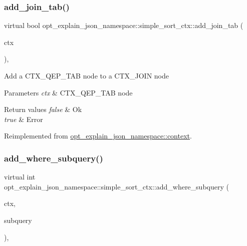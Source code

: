 \subsubsection{\texorpdfstring{add\+\_\+join\+\_\+tab()}{add\_join\_tab()}}
{\footnotesize\ttfamily virtual bool opt\+\_\+explain\+\_\+json\+\_\+namespace\+::simple\+\_\+sort\+\_\+ctx\+::add\+\_\+join\+\_\+tab (\begin{DoxyParamCaption}\item[{\mbox{\hyperlink{classopt__explain__json__namespace_1_1joinable__ctx}{joinable\+\_\+ctx}} $\ast$}]{ctx }\end{DoxyParamCaption})\hspace{0.3cm}{\ttfamily [inline]}, {\ttfamily [virtual]}}

Add a C\+T\+X\+\_\+\+Q\+E\+P\+\_\+\+T\+AB node to a C\+T\+X\+\_\+\+J\+O\+IN node


\begin{DoxyParams}{Parameters}
{\em ctx} & C\+T\+X\+\_\+\+Q\+E\+P\+\_\+\+T\+AB node\\
\hline
\end{DoxyParams}

\begin{DoxyRetVals}{Return values}
{\em false} & Ok \\
\hline
{\em true} & Error \\
\hline
\end{DoxyRetVals}


Reimplemented from \mbox{\hyperlink{classopt__explain__json__namespace_1_1context_a3f7a03f0bf2a519a19b84cb5a99ee304}{opt\+\_\+explain\+\_\+json\+\_\+namespace\+::context}}.

\mbox{\label{classopt__explain__json__namespace_1_1simple__sort__ctx_a334cf6e47221f587df9e1012819cf19d}} 
\subsubsection{\texorpdfstring{add\+\_\+where\+\_\+subquery()}{add\_where\_subquery()}}
{\footnotesize\ttfamily virtual int opt\+\_\+explain\+\_\+json\+\_\+namespace\+::simple\+\_\+sort\+\_\+ctx\+::add\+\_\+where\+\_\+subquery (\begin{DoxyParamCaption}\item[{\mbox{\hyperlink{classopt__explain__json__namespace_1_1subquery__ctx}{subquery\+\_\+ctx}} $\ast$}]{ctx,  }\item[{S\+E\+L\+E\+C\+T\+\_\+\+L\+E\+X\+\_\+\+U\+N\+IT $\ast$}]{subquery }\end{DoxyParamCaption})\hspace{0.3cm}{\ttfamily [inline]}, {\ttfamily [virtual]}}

